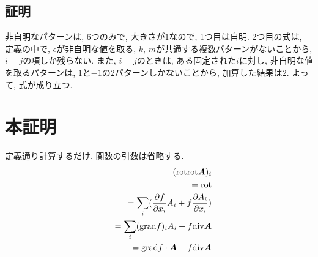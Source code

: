 \documentclass{jsarticle}
\newcommand*{\mbold}[1]{\mbox{\boldmath $#1$}}
\newcommand*{\grad}{{\rm grad}}
\newcommand*{\divg}{{\rm div}}
\newcommand*{\rot}{{\rm rot}}
\begin{document}
\subsection{証明}
非自明なパターンは, 6つのみで, 大きさが$1$なので, 1つ目は自明. 
2つ目の式は, 定義の中で, $\epsilon$が非自明な値を取る, $k$, $m$が共通する複数パターンがないことから, 
$i = j$の項しか残らない. 
また, $i = j$のときは, ある固定された$i$に対し, 非自明な値を取るパターンは, $1$と$-1$の2パターンしかないことから, 
加算した結果は$2$. 
よって, 式が成り立つ. 

\section*{本証明}
定義通り計算するだけ. 関数の引数は省略する. 
\begin{eqnarray}
  && (\rot\rot\mbold{A})_i \nonumber \\
  && = \rot \nonumber \\
  && = \sum_i (\frac{\partial f}{\partial x_i} A_i + f \frac{\partial A_i}{\partial x_i}) \nonumber \\
  && = \sum_i (\grad f)_i A_i + f \divg\mbold{A} \nonumber \\
  && = \grad f \cdot \mbold{A} + f \divg\mbold{A}
\end{eqnarray}
\end{document}
